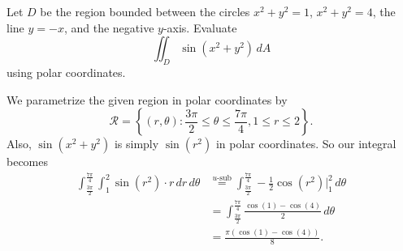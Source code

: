 \begin{problem}
  Let $D$ be the region bounded between the circles $x^2+y^2=1$, $x^2+y^2=4$, the line $y=-x$, and the negative $y$-axis. Evaluate
  \[\iint_D\sin(x^2+y^2)\,dA\]
  using polar coordinates.
\end{problem}
\begin{solution}
  We parametrize the given region in polar coordinates by
  \[\mathcal R=\left\{(r,\theta):\frac{3\pi}2\leq \theta\leq \frac{7\pi}4,1\leq r\leq 2\right\}.\]
  Also, $\sin(x^2+y^2)$ is simply $\sin(r^2)$ in polar coordinates. So our integral becomes
  \[\begin{split}
    \int_{\frac{3\pi}2}^{\frac{7\pi}4}\int_1^2\sin(r^2)\cdot r\,dr\,d\theta &\overset{u\text{-sub}}= \int_{\frac{3\pi}2}^{\frac{7\pi}4} -\frac12\cos(r^2)\Big|_1^2\,d\theta\\
    &= \int_{\frac{3\pi}2}^{\frac{7\pi}4}\frac{\cos(1)-\cos(4)}2\,d\theta\\
    &= \frac{\pi(\cos(1)-\cos(4))}{8}.
  \end{split}\]
\end{solution}

